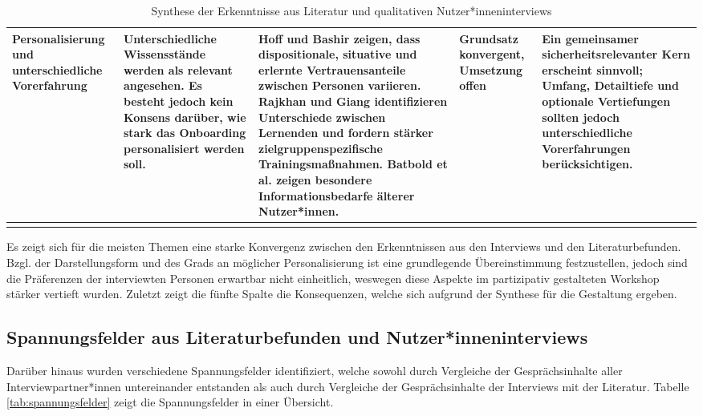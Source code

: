 {\begin{xltabular}{\textwidth}{
    |P{2.4cm}
    |P{2.8cm}
    |Y
    |P{1.8cm}
    |P{2.6cm}|
}
Personalisierung und unterschiedliche Vorerfahrung &
Unterschiedliche Wissensstände werden als relevant angesehen. Es besteht
jedoch kein Konsens darüber, wie stark das Onboarding personalisiert werden
soll. &
Hoff und Bashir \cite{hoff2015trust} zeigen, dass dispositionale, situative und erlernte
Vertrauensanteile zwischen Personen variieren. Rajkhan und Giang \cite{rajkhan2025automated}
identifizieren Unterschiede zwischen Lernenden und fordern stärker
zielgruppenspezifische Trainingsmaßnahmen. Batbold et al. \cite{batbold2024mentorable} zeigen
besondere Informationsbedarfe älterer Nutzer*innen. &
Grundsatz konvergent, Umsetzung offen &
Ein gemeinsamer sicherheitsrelevanter Kern erscheint sinnvoll; Umfang,
Detailtiefe und optionale Vertiefungen sollten jedoch unterschiedliche
Vorerfahrungen berücksichtigen.
\\
\hline

\caption{Synthese der Erkenntnisse aus Literatur und qualitativen
Nutzer*inneninterviews}
\label{tab:synthese-literatur-interviews}
\\

\end{xltabular}
}

Es zeigt sich für die meisten Themen eine starke Konvergenz zwischen den Erkenntnissen aus den Interviews und den Literaturbefunden. Bzgl. der Darstellungsform und des Grads an möglicher Personalisierung ist eine grundlegende Übereinstimmung festzustellen, jedoch sind die Präferenzen der interviewten Personen erwartbar nicht einheitlich, weswegen diese Aspekte im partizipativ gestalteten Workshop stärker vertieft wurden. Zuletzt zeigt die fünfte Spalte die Konsequenzen, welche sich aufgrund der Synthese für die Gestaltung ergeben.

\subsection{Spannungsfelder aus Literaturbefunden und Nutzer*inneninterviews}
\label{subsec:Ergebnisse_Spannungsfelder}

Darüber hinaus wurden verschiedene Spannungsfelder identifiziert, welche sowohl durch Vergleiche der Gesprächsinhalte aller Interviewpartner*innen untereinander entstanden als auch durch Vergleiche der Gesprächsinhalte der Interviews mit der Literatur. Tabelle \ref{tab:spannungsfelder} zeigt die Spannungsfelder in einer Übersicht. 

